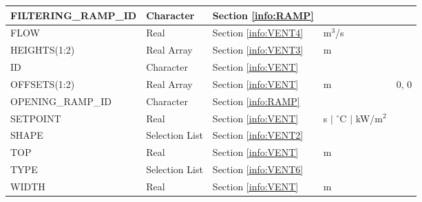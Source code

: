 \begin{longtable}{@{\extracolsep{\fill}}|l|l|l|l|l|}
{\ct FILTERING\_RAMP\_ID}    	  & Character   & Section \ref{info:RAMP}                 &                             &                 \\ \hline
{\ct FLOW}      	  & Real  	& Section \ref{info:VENT4}                 & m$^3$/s                     &                 \\ \hline
{\ct HEIGHTS(1:2)}         & Real Array 	& Section \ref{info:VENT3}                 & m                           &                 \\ \hline
{\ct ID}       		  & Character   & Section \ref{info:VENT}                 &                             &                 \\ \hline
{\ct OFFSETS(1:2)}         & Real Array 	& Section \ref{info:VENT}                 & m                           &      0, 0        \\ \hline
{\ct OPENING\_RAMP\_ID}   & Character  	& Section \ref{info:RAMP}                 &                             &                 \\ \hline
{\ct SETPOINT}            & Real  	& Section \ref{info:VENT}                 & s $\mid$ $^\circ$C $\mid$ kW/m$^2$ &                 \\ \hline
{\ct SHAPE}     	  & Selection List   & Section \ref{info:VENT2}                 &                             &                 \\ \hline
{\ct TOP}                 & Real  	& Section \ref{info:VENT}                 & m                           &                 \\ \hline
{\ct TYPE}                & Selection List    & Section \ref{info:VENT6}                 &                             &                 \\ \hline
{\ct WIDTH}               & Real  	& Section \ref{info:VENT}                 & m                           &                 \\ \hline
\end{longtable}


